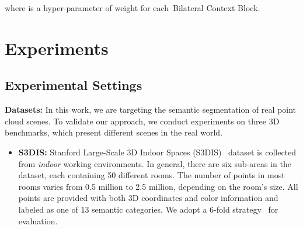 \documentclass[10pt,twocolumn,letterpaper]{article}
\def\ourblock{Bilateral Context Block}
\begin{document}
where  is a hyper-parameter of weight for each~\ourblock.
%
 \section{Experiments}
\label{sec:exp}
\subsection{Experimental Settings}
\noindent \textbf{Datasets:}
In this work, we are targeting the semantic segmentation of real point cloud scenes. To validate our approach, we conduct experiments on three 3D benchmarks, which present different scenes in the real world. 
\begin{itemize}
 \item \textbf{S3DIS:} 
Stanford Large-Scale 3D Indoor Spaces (S3DIS)~\cite{armeni2017joint} dataset is collected from \emph{indoor} working environments. In general, there are six sub-areas in the dataset, each containing 50 different rooms. The number of points in most rooms varies from 0.5 million to 2.5 million, depending on the room's size. All points are provided with both 3D coordinates and color information and labeled as one of 13 semantic categories. We adopt a 6-fold strategy~\cite{qi2017pointnet} for evaluation.
\begin{table}
\begin{center}
\captionsetup{font=small, skip=3pt}
\caption{Semantic segmentation (6-fold cross-validation) results (\%) on the \emph{S3DIS} dataset~\cite{armeni2017joint}. (\textbf{mAcc}: average class accuracy, \textbf{OA}: overall accuracy, \textbf{mIoU}: mean Intersection-over-Union. \enquote{-} indicates unknown result.)}
\end{center}
\end{table}
\end{itemize}
\end{document}

